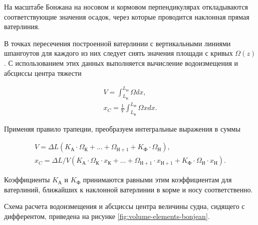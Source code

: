 На масштабе Бонжана на носовом и кормовом перпендикулярах откладываются соответствующие значения осадок, через которые проводится наклонная прямая ватерлиния.

В точках пересечения построенной ватерлинии с вертикальными линиями шпангоутов для каждого из них следует снять значения площади с кривых $\Omega(z)$.
С использованием этих данных выполняется вычисление водоизмещения и абсциссы центра тяжести

\begin{equation}
    \begin{split}
    V = \int_{L_{\text{К}}}^{L_{\text{Н}}} \Omega dx, \\
    x_C = \frac{1}{V} \int_{L_{\text{К}}}^{L_{\text{Н}}} \Omega x dx.
    \end{split}
\end{equation}

Применяя правило трапеции, преобразуем интегральные выражения в суммы

\begin{equation}
    \begin{split}
    V = \Delta L (K_{\text{А}} \cdot \Omega_{\text{К}} + \dots + \Omega_{\text{Н}+1} + K_{\text{Ф}} \cdot \Omega_{\text{Н}}), \\
    x_C = \Delta L / V (K_{\text{А}} \cdot \Omega_{\text{К}} \cdot x_{\text{К}} + \dots + \Omega_{\text{Н}+1} \cdot x_{\text{Н}+1} + K_{\text{Ф}} \cdot \Omega_{\text{Н}} \cdot x_{\text{Н}}).
    \end{split}
\end{equation}

Коэффициенты $K_{\text{А}}$ и $K_{\text{Ф}}$ принимаются равными этим коэффициентам для ватерлиний, ближайших к наклонной ватерлинии в корме и носу соответственно.

Схема расчета водоизмещения и абсциссы центра величины судна, сидящего с дифферентом, приведена на рисунке \ref{fig:volume-elements-bonjean}.

